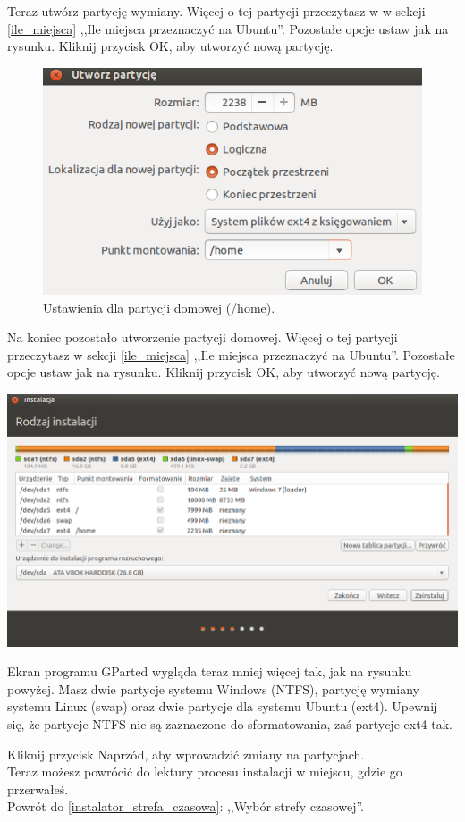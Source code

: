 Teraz utwórz partycję wymiany. Więcej o tej partycji przeczytasz w w sekcji \ref{ile_miejsca} ,,Ile miejsca przeznaczyć na Ubuntu''. Pozostałe opcje ustaw jak na rysunku. Kliknij przycisk \textcolor{ubuntu_orange}{OK}, aby utworzyć nową partycję.

\begin{figure}
	\vspace{-10pt}
	\includegraphics[width=\linewidth]{images/instalator_partycjonowanie_gparted_dodaj_home.png}
	\caption*{Ustawienia dla partycji domowej (/home).}
\end{figure}

Na koniec pozostało utworzenie partycji domowej. Więcej o tej partycji przeczytasz w sekcji \ref{ile_miejsca} ,,Ile miejsca przeznaczyć na Ubuntu''. Pozostałe opcje ustaw jak na rysunku. Kliknij przycisk \textcolor{ubuntu_orange}{OK}, aby utworzyć nową partycję.

\begin{center}
	\includegraphics[width=\linewidth]{images/instalator_partycjonowanie_gparted4.png}
\end{center}

Ekran programu GParted wygląda teraz mniej więcej tak, jak na rysunku powyżej. Masz dwie partycje systemu Windows (NTFS), partycję wymiany systemu Linux (swap) oraz dwie partycje dla systemu Ubuntu (ext4). Upewnij się, że partycje NTFS \textcolor{ubuntu_orange}{nie} są zaznaczone do sformatowania, zaś partycje ext4 tak.

Kliknij przycisk \textcolor{ubuntu_orange}{Naprzód}, aby wprowadzić zmiany na partycjach.\\
Teraz możesz powrócić do lektury procesu instalacji w miejscu, gdzie go przerwałeś.\\
Powrót do \ref{instalator_strefa_czasowa}: ,,Wybór strefy czasowej''.
\clearpage
